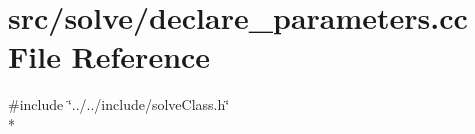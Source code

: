 \section{src/solve/declare\-\_\-parameters.cc File Reference}
\label{solve_2declare__parameters_8cc}
{\ttfamily \#include \char`\"{}../../include/solve\-Class.\-h\char`\"{}}\\*
